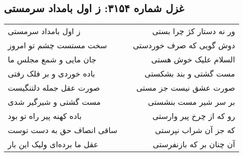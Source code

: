 \begin{center}
\section*{غزل شماره ۳۱۵۴: ز اول بامداد سرمستی}
\label{sec:3154}
\begin{longtable}{l p{0.5cm} r}
ز اول بامداد سرمستی
&&
ور نه دستار کژ چرا بستی
\\
سخت مستست چشم تو امروز
&&
دوش گویی که صرف خوردستی
\\
جان مایی و شمع مجلس ما
&&
السلام علیک خوش هستی
\\
باده خوردی و بر فلک رفتی
&&
مست گشتی و بند بشکستی
\\
صورت عقل جمله دلتنگیست
&&
صورت عشق نیست جز مستی
\\
مست گشتی و شیرگیر شدی
&&
بر سر شیر مست بنشستی
\\
باده کهنه پیر راه تو بود
&&
رو که از چرخ پیر وارستی
\\
ساقی انصاف حق به دست توست
&&
که جز آن شراب نپرستی
\\
عقل ما برده‌ای ولیک این بار
&&
آن چنان بر که بازنفرستی
\\
\end{longtable}
\end{center}

